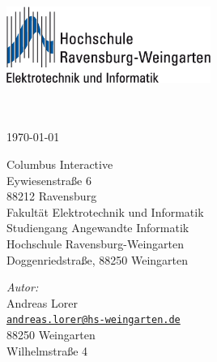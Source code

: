 \begin{titlepage}
  \begin{center}

    \includegraphics[width=0.5\textwidth]{../deckblatt/images/logo.png}\\[2cm]    
    {\huge \bfseries \headline}\\[0.5cm]
    {\huge \bfseries \subheadline}\\[0.5cm]
    
    \begin{abstract}
      \noindent
       \\[1cm]
    \end{abstract}

    {\large \today}\\[1cm]
    \vspace{2cm}

	\begin{flushleft}
      \hspace*{3cm} Columbus Interactive\\
      \hspace*{3cm} Eywiesenstraße 6\\
      \hspace*{3cm} 88212 Ravensburg\\
      \vspace{1cm}
      \hspace*{3cm} Fakultät Elektrotechnik und Informatik\\
      \hspace*{3cm} Studiengang Angewandte Informatik\\
      \hspace*{3cm} Hochschule Ravensburg-Weingarten\\
      \hspace*{3cm} Doggenriedstraße, 88250 Weingarten

    \end{flushleft}

    \vspace{1.5cm}

    \begin{flushleft}\large
	  \hspace*{2cm} \emph{Autor:}\\
	  \hspace*{2cm} Andreas Lorer\\
	  \hspace*{2cm} \href{mailto:andreas.lorer@hs-weingarten.de}{\nolinkurl{andreas.lorer@hs-weingarten.de} }\\
      \hspace*{2cm} 88250 Weingarten\\
      \hspace*{2cm} Wilhelmstraße 4
    \end{flushleft}
   \end{center}
   \vfill
\end{titlepage}
